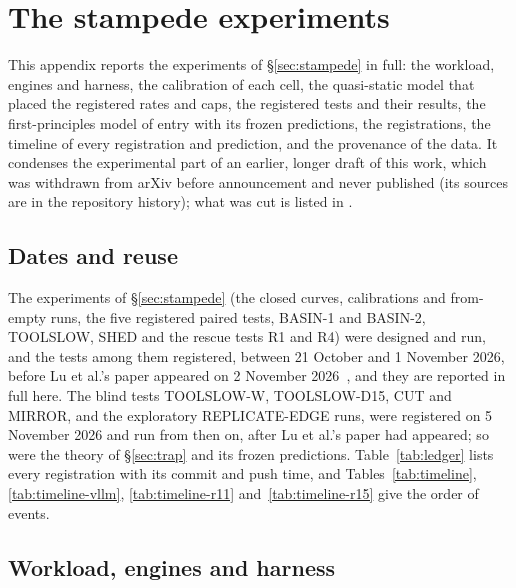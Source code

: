 \section{The stampede experiments}\label{app:stampede}

This appendix reports the experiments of \S\ref{sec:stampede} in full: the workload, engines and harness, the calibration of each
cell, the quasi-static model that placed the registered rates and caps, the registered tests and their results, the first-principles
model of entry with its frozen predictions, the registrations, the timeline of every registration and prediction, and the
provenance of the data. It condenses the experimental part of an earlier, longer draft of this work, which was withdrawn from arXiv before
announcement and never published (its sources are in the repository history); what was cut is listed in
.

\subsection{Dates and reuse}\label{app:reuse}
The experiments of \S\ref{sec:stampede} (the closed curves, calibrations and from-empty runs, the five registered paired tests,
BASIN-1 and BASIN-2, TOOLSLOW, SHED and the rescue tests R1 and R4) were designed and run, and the tests among them registered,
between 21 October and 1 November 2026, before Lu et al.'s paper appeared on 2 November 2026~\citep{lu2026cachetrap}, and they are reported in full here.
The blind tests TOOLSLOW-W, TOOLSLOW-D15, CUT and MIRROR, and the exploratory REPLICATE-EDGE runs, were registered on
5 November 2026 and run from then on, after Lu et al.'s
paper had appeared; so were the theory of \S\ref{sec:trap} and its frozen predictions. Table~\ref{tab:ledger} lists every
registration with its commit and push time, and Tables~\ref{tab:timeline}, \ref{tab:timeline-vllm}, \ref{tab:timeline-r11}
and~\ref{tab:timeline-r15} give the order of events.

\subsection{Workload, engines and harness}\label{app:harness}

